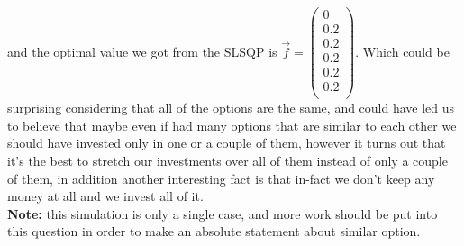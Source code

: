 \documentclass{article}
\begin{document}
	and the optimal value we got from the SLSQP is 
	\begin{math}
		\overrightarrow{f} = 
		\begin{pmatrix}
			0 \\
			0.2 \\
			0.2 \\
			0.2 \\
			0.2 \\
			0.2 \\
		\end{pmatrix}
	\end{math}.
	\newline\newline
	Which could be surprising considering that all of the options are the same, and could have led us to believe that maybe even if had many options that are similar to each other we should have invested only in one or a couple of them, however it turns out that it's the best to stretch our investments over all of them instead of only a couple of them, in addition another interesting fact is that in-fact we don't keep any money at all and we invest all of it.\\
	\textbf{Note:} this simulation is only a single case, and more work should be put into this question in order to make an absolute statement about similar option.
\end{document}
